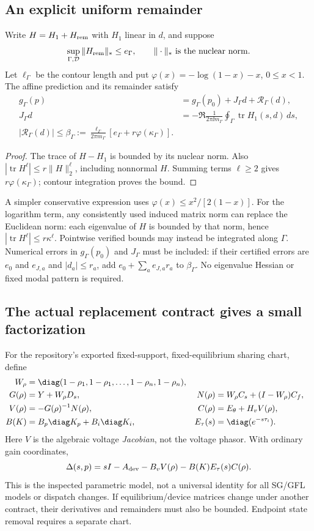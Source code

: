 \subsection{An explicit uniform remainder}
Write $H=H_1+H_{\rm rem}$ with $H_1$ linear in $d$, and suppose
\[
 \sup_{\Gamma,\mathcal D}\|H_{\rm rem}\|_*
 \le e_\Gamma,\qquad \|\cdot\|_* \text{ is the nuclear norm}.
\]
Let $\ell_\Gamma$ be the contour length and put
$\varphi(x)=-\log(1-x)-x$, $0\le x<1$.
The affine prediction and its remainder satisfy
\begin{align}
 g_\Gamma(p)&=g_\Gamma(p_0)+J_\Gamma d+\mathcal R_\Gamma(d),\\
 J_\Gamma d&=-\Re\frac{1}{2\pi\ii m_\Gamma}
                     \oint_\Gamma\operatorname{tr}H_1(s,d)\,ds,\\
 \boxed{|\mathcal R_\Gamma(d)|\le\beta_\Gamma
 :=\frac{\ell_\Gamma}{2\pi m_\Gamma}
       [e_\Gamma+r\varphi(\kappa_\Gamma)] .}
 \label{eq:regional-remainder}
\end{align}
\begin{proof}
The trace of $H-H_1$ is bounded by its nuclear norm.
Also $|\operatorname{tr}H^\ell|\le r\|H\|_2^\ell$,
including nonnormal $H$. Summing terms $\ell\ge2$ gives
$r\varphi(\kappa_\Gamma)$; contour integration proves the bound.
\end{proof}
A simpler conservative expression uses
$\varphi(x)\le x^2/[2(1-x)]$.
For the logarithm term, any consistently used induced matrix norm
can replace the Euclidean norm: each eigenvalue of $H$ is bounded
by that norm, hence $|\operatorname{tr}H^\ell|\le r\kappa^\ell$.
Pointwise verified bounds may instead be integrated along $\Gamma$.
Numerical errors in $g_\Gamma(p_0)$ and $J_\Gamma$ must be included:
if their certified errors are $e_0$ and $e_{J,a}$ and
$|d_a|\le r_a$, add $e_0+\sum_a e_{J,a}r_a$ to $\beta_\Gamma$.
No eigenvalue Hessian or fixed modal pattern is required.

\subsection{The actual replacement contract gives a small factorization}
For the repository's exported fixed-support, fixed-equilibrium sharing
chart, define
\begin{align*}
 W_\rho&=\diag(1-\rho_1,1-\rho_1,\ldots,1-\rho_n,1-\rho_n),\\
 G(\rho)&=Y+W_\rho D_s,&
 N(\rho)&=W_\rho C_s+(I-W_\rho)C_f,\\
 V(\rho)&=-G(\rho)^{-1}N(\rho),&
 C(\rho)&=E_\theta+H_vV(\rho),\\
 B(K)&=B_p\diag K_p+B_i\diag K_i,&
 E_\tau(s)&=\diag(e^{-s\tau_i}).
\end{align*}
Here $V$ is the algebraic voltage \emph{Jacobian}, not the voltage phasor.
With ordinary gain coordinates,
\[
 \Delta(s,p)=sI-A_{\rm dev}-B_vV(\rho)-B(K)E_\tau(s)C(\rho).
\]
This is the inspected parametric model, not a universal identity for
all SG/GFL models or dispatch changes. If equilibrium/device matrices
change under another contract, their derivatives and remainders must
also be bounded. Endpoint state removal requires a separate chart.

